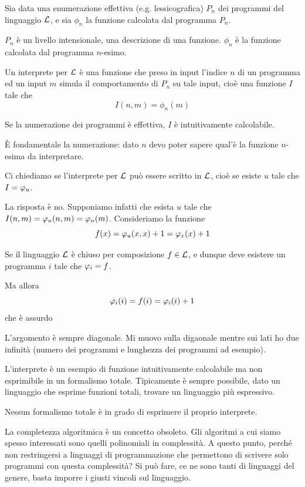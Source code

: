 Sia data una enumerazione effettiva (e.g. lessicografica) $P_{n}$ dei programmi del
linguaggio $\mathcal{L}$, e sia $\phi_{n}$ la funzione calcolata dal programma $P_{n}$.

$P_{n}$ è un livello intensionale, una descrizione di una funzione. $\phi_{n}$ è la funzione
calcolata dal programma $n$-esimo.

Un interprete per $\mathcal{L}$ è una funzione che preso in input l'indice $n$ di un programma ed un
input $m$ simula il comportamento di $P_{n}$ su tale input, cioè una funzione $I$ tale che
\begin{equation*}
    I (n, m) = \phi_{n}(m)
\end{equation*}

Se la numerazione dei programmi è effettiva, $I$ è intuitivamente calcolabile.

È fondamentale la numerazione: dato $n$ devo poter sapere qual'è la funzione $n$-esima da interpretare.

Ci chiediamo se l'interprete per $\mathcal{L}$ può essere scritto in $\mathcal{L}$, cioè se esiste $u$ tale
che $I = \varphi_{u}$.

La risposta è no. Supponiamo infatti che esista $u$ tale che $I(n, m) = \varphi_{u}(n, m) = \varphi_{n}(m)$.
Consideriamo la funzione
\begin{equation*}
    f(x) = \varphi_{u}(x,x) + 1 = \varphi_{x}(x)+1
\end{equation*}

Se il linguaggio $\mathcal{L}$ è chiuso per composizione $f \in \mathcal{L}$, e dunque deve esistere un
programma $i$ tale che $\varphi_{i} = f$.

Ma allora
\begin{equation*}
    \varphi_{i}(i) = f(i) = \varphi_{i}(i) + 1
\end{equation*}
che è assurdo

L'argomento è sempre diagonale. Mi muovo sulla digaonale mentre sui lati ho due infinità (numero
dei programmi e lunghezza dei programmi ad esempio).

L'interprete è un esempio di funzione intuitivamente calcolabile ma non esprimibile in un formalismo
totale. Tipicamente è sempre possibile, dato un linguaggio che esprime funzioni totali, trovare un
linguaggio più espressivo.

\begin{thm}
    Nessun formalismo totale è in grado di esprimere il proprio interprete.
\end{thm}

La completezza algoritmica è un concetto obsoleto. Gli algoritmi a cui siamo spesso interessati sono
quelli polinomiali in complessità. A questo punto, perché non restringersi a linguaggi di
programmazione che permettono di scrivere solo programmi con questa complessità? Si può fare, ce ne
sono tanti di linguaggi del genere, basta imporre i giusti vincoli sul linguaggio.

